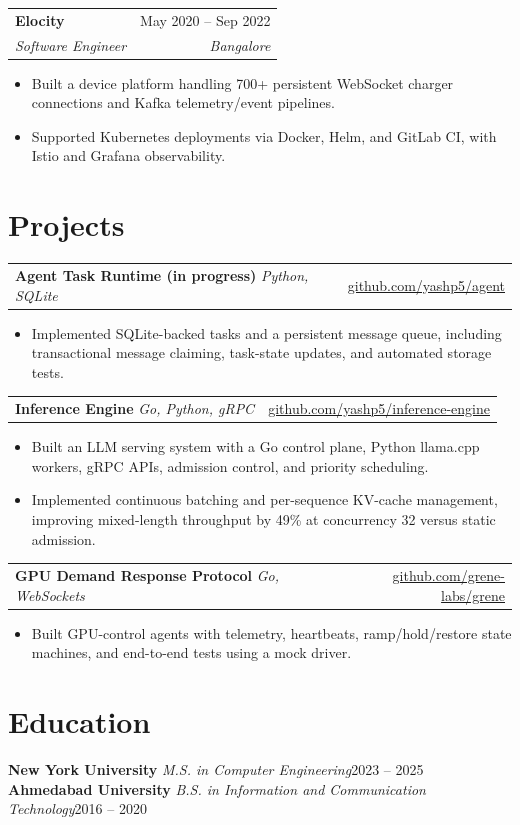\documentclass[letterpaper,12pt]{article}
\makeatletter
\newcommand{\entry}[4]{%
  \begin{tabularx}{\textwidth}{@{}X@{}r@{}}
    \textbf{#1} & {\small\color{muted}#2} \\
    {\small\itshape #3} & {\small\itshape\color{muted}#4} \\
  \end{tabularx}\vspace{3pt}
}
\newcommand{\project}[3]{%
  \begin{tabularx}{\textwidth}{@{}X@{}r@{}}
    \textbf{#1}\; {\small\color{muted}\itshape #2} & {\small #3} \\
  \end{tabularx}\vspace{3.5pt}
}
\newenvironment{bullets}
  {\begin{itemize}[leftmargin=1.1em, itemsep=0pt, topsep=0pt, parsep=0pt, label={\color{muted}\footnotesize\textbullet}]\fontsize{11}{13.0}\selectfont}
  {\end{itemize}\vspace{-3pt}}
\makeatother
\begin{document}
\vspace{7pt}
\entry{Elocity}{May 2020 -- Sep 2022}{Software Engineer}{Bangalore}
\begin{bullets}
  \item Built a device platform handling 700+ persistent WebSocket charger connections and Kafka telemetry/event pipelines.
  \item Supported Kubernetes deployments via Docker, Helm, and GitLab CI, with Istio and Grafana observability.
\end{bullets}

\section{Projects}

\project{Agent Task Runtime (in progress)}{Python, SQLite}{\href{https://github.com/yashp5/agent}{github.com/yashp5/agent}}
\begin{bullets}
  \item Implemented SQLite-backed tasks and a persistent message queue, including transactional message claiming, task-state updates, and automated storage tests.
\end{bullets}

\vspace{6pt}
\project{Inference Engine}{Go, Python, gRPC}{\href{https://github.com/yashp5/inference-engine}{github.com/yashp5/inference-engine}}
\begin{bullets}
  \item Built an LLM serving system with a Go control plane, Python llama.cpp workers, gRPC APIs, admission control, and priority scheduling.
  \item Implemented continuous batching and per-sequence KV-cache management, improving mixed-length throughput by 49\% at concurrency 32 versus static admission.
\end{bullets}

\vspace{6pt}
\project{GPU Demand Response Protocol}{Go, WebSockets}{\href{https://github.com/grene-labs/grene}{github.com/grene-labs/grene}}
\begin{bullets}
  \item Built GPU-control agents with telemetry, heartbeats, ramp/hold/restore state machines, and end-to-end tests using a mock driver.
\end{bullets}

\section{Education}
\textbf{New York University}\hspace{.5em} {\small\itshape M.S. in Computer Engineering}\hfill{\small\color{muted}2023 -- 2025}\\[1pt]
\textbf{Ahmedabad University}\hspace{.5em} {\small\itshape B.S. in Information and Communication Technology}\hfill{\small\color{muted}2016 -- 2020}
\end{document}
